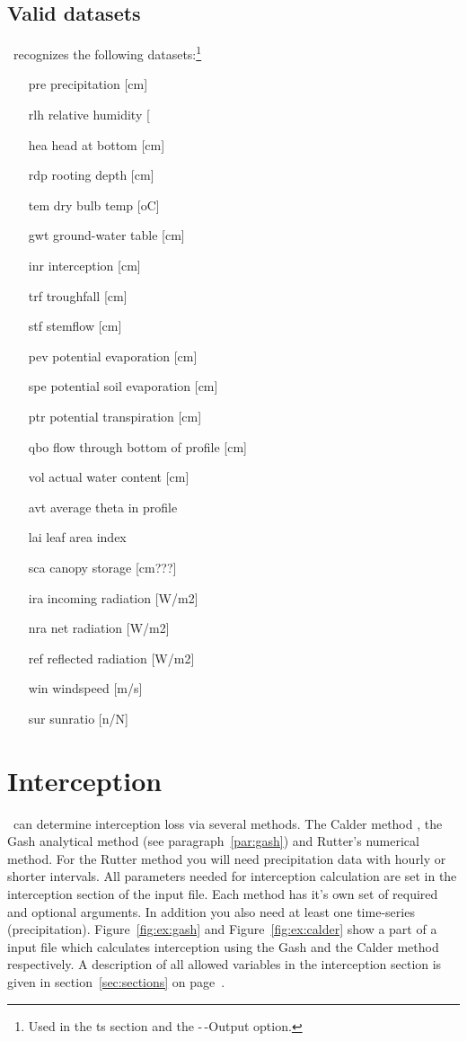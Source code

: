 \subsection{Valid datasets}
\vamps\ recognizes the following datasets:\footnote{Used in the ts section
and the -\,-Output option.}
\begin{itemize}
\item[pre] precipitation [cm]
\item[rlh] relative humidity [%
\item[hea] head at bottom [cm] 
\item[rdp] rooting depth [cm] 
\item[tem] dry bulb temp [oC] 
\item[gwt] ground-water table [cm] 
\item[inr] interception [cm] 
\item[trf] troughfall   [cm] 
\item[stf] stemflow     [cm] 
\item[pev] potential evaporation [cm] 
\item[spe] potential soil evaporation [cm] 
\item[ptr] potential transpiration [cm] 
\item[qbo] flow through bottom of profile [cm] 
\item[vol] actual water content [cm] 
\item[avt] average theta in profile 
\item[lai] leaf area index 
\item[sca] canopy storage [cm???] 
\item[ira] incoming radiation [W/m2] 
\item[nra] net radiation [W/m2] 
\item[ref] reflected radiation [W/m2] 
\item[win] windspeed [m/s] 
\item[sur] sunratio [n/N] 
\end{itemize}

\section{Interception}
\vamps\ can determine interception loss via several methods. The
Calder method \cite{calder1986171}, the Gash analytical method (see
paragraph~\ref{par:gash}) and Rutter's
\cite{rutter1971174} numerical method. For the Rutter method you will need
precipitation data with hourly or shorter intervals.  All parameters
needed for interception calculation are set in the interception section
of the input file. Each method has it's own set of required and optional
arguments. In addition you also need at least one time-series
(precipitation). Figure~\ref{fig:ex:gash} and Figure~\ref{fig:ex:calder}
show a part of a input file which calculates interception using the Gash
and the Calder method respectively. A description of all allowed variables
in the interception section is given in section~\ref{sec:sections} on
page~\pageref{section:interception}.

